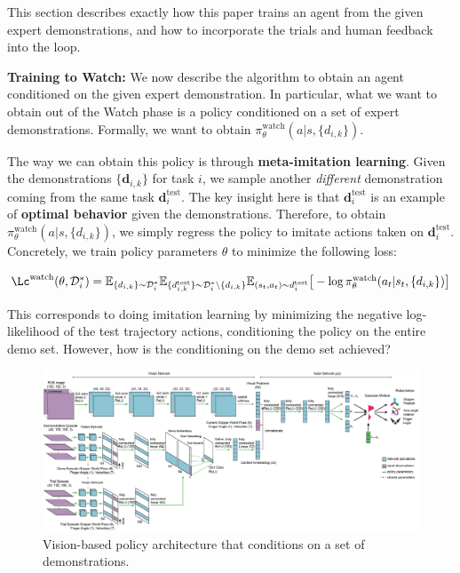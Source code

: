 \documentclass[
  letterpaper,
  DIV=11,
  numbers=noendperiod,
  oneside]{scrreprt}
\theoremstyle{remark}
\begin{document}
This section describes exactly how this paper trains an agent from the
given expert demonstrations, and how to incorporate the trials and human
feedback into the loop.

\textbf{Training to Watch:} We now describe the algorithm to obtain an
agent conditioned on the given expert demonstration. In particular, what
we want to obtain out of the Watch phase is a policy conditioned on a
set of expert demonstrations. Formally, we want to obtain
\(\pi_\theta^{\text{watch}}(a | s, \{d_{i,k}\})\).

The way we can obtain this policy is through \textbf{meta-imitation
learning}. Given the demonstrations \(\{\textbf{d}_{i,k}\}\) for task
\(i\), we sample another \emph{different} demonstration coming from the
same task \(\textbf{d}_i^{\text{test}}\). The key insight here is that
\(\textbf{d}_i^{\text{test}}\) is an example of \textbf{optimal
behavior} given the demonstrations. Therefore, to obtain
\(\pi_\theta^{\text{watch}}(a | s, \{d_{i,k}\})\), we simply regress the
policy to imitate actions taken on \(\textbf{d}_i^{\text{test}}\).
Concretely, we train policy parameters \(\theta\) to minimize the
following loss:

\(\Lc^\text{watch}(\theta, \mathcal{D}_i^*) = \mathbb{E}_{\{d_{i,k}\} \sim \mathcal{D}_i^*} \mathbb{E}_{\{d_{i,k}^{\text{test}}\} \sim \mathcal{D}_i^* \text{\textbackslash} \{d_{i,k}\}} \mathbb{E}_{(s_t, a_t) \sim d_i^{\text{test}}} \big[
- \log \pi_\theta^{\text{watch}} (a_t | s_t, \{d_{i,k}\}) \big]\)

This corresponds to doing imitation learning by minimizing the negative
log-likelihood of the test trajectory actions, conditioning the policy
on the entire demo set. However, how is the conditioning on the demo set
achieved?

\begin{figure}

{\centering \includegraphics{Figures/watch-try-learn-architecture.png}

}

\caption{Vision-based policy architecture that conditions on a set of
demonstrations.}

\end{figure}%
\end{document}
